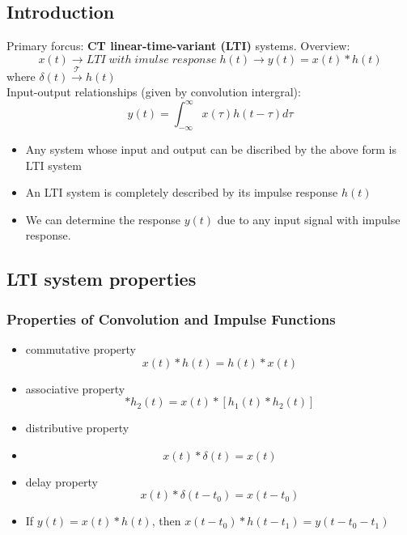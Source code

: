 \documentclass{article}
\theoremstyle{definition}
\begin{document}
\subsection{Introduction}
Primary forcus: \textbf{CT linear-time-variant (LTI)} systems.
Overview:\\
\begin{equation}
    x(t)\rightarrow \boxed{LTI\; with \; imulse\; response\; h(t)}\rightarrow y(t) = x(t) * h(t)
\end{equation}
where $ \delta(t) \mathop{\rightarrow}\limits^\mathcal{T} h(t) $\\
Input-output relationships (given by convolution intergral):
\begin{equation}
    y(t)=\int _{-\infty}^{\infty} x(\tau) h(t-\tau)d\tau
\end{equation}
\begin{itemize}
    \item Any system whose input and output can be discribed by the above form is LTI system
    \item An LTI system is completely described by its impulse response $ h(t) $
    \item We can determine the response $ y(t) $ due to any input signal with impulse response.
\end{itemize}
\subsection{LTI system properties}
\subsubsection{Properties of Convolution and Impulse Functions}
\begin{itemize}
    \item commutative property
        \begin{equation}
            x(t)*h(t)=h(t)*x(t)
        \end{equation}
    \item associative property
        \begin{equation}
            [x(t)*h_1(t)]*h_2(t)=x(t)*[h_1(t)*h_2(t)]
        \end{equation}
    \item distributive property
    \item \begin{equation}
        x(t)*\delta(t)=x(t)
    \end{equation}
    \item delay property
        \begin{equation}
            x(t)*\delta(t-t_0)=x(t-t_0)
        \end{equation}
    \item If $ y(t)=x(t)*h(t) $, then $ x(t-t_0)*h(t-t_1)=y(t-t_0-t_1) $
\end{itemize}
\end{document}
